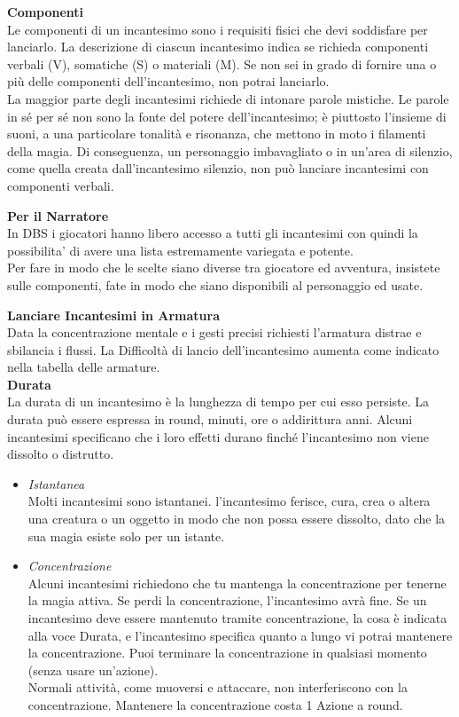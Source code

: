 \textbf{Componenti}\\
Le componenti di un incantesimo sono i requisiti fisici  che devi soddisfare per lanciarlo. La descrizione di  ciascun incantesimo indica se richieda componenti  verbali (V), somatiche (S) o materiali (M). Se non sei in  grado di fornire una o più delle componenti  dell'incantesimo, non potrai lanciarlo.\\
La maggior parte degli incantesimi richiede di intonare parole mistiche. Le parole in sé per sé non sono la  fonte del potere dell'incantesimo; è piuttosto l’insieme di suoni, a una particolare tonalità e risonanza, che mettono in moto i filamenti della magia. Di conseguenza, un personaggio imbavagliato o in un'area di silenzio, come quella creata dall'incantesimo silenzio, non può lanciare incantesimi con componenti verbali.\\
\begin{note}\textbf{Per il Narratore}\\
In DBS i giocatori hanno libero accesso a tutti gli incantesimi con quindi la possibilita' di avere una lista estremamente variegata e potente.\\
Per fare in modo che le scelte siano diverse tra giocatore ed avventura, insistete sulle componenti, fate in modo che siano disponibili al personaggio ed usate.
\end{note}

\textbf{Lanciare Incantesimi in Armatura}\\
Data la concentrazione mentale e i gesti precisi richiesti l'armatura distrae e sbilancia i flussi. La Difficoltà di lancio dell'incantesimo aumenta come indicato nella tabella delle armature.\\

\textbf{Durata}\\
La durata di un incantesimo è la lunghezza di tempo per cui esso persiste. La durata può essere espressa in round, minuti, ore o addirittura anni. Alcuni incantesimi specificano che i loro effetti durano finché l'incantesimo non viene dissolto o distrutto.\\
\begin{itemize}
\item
\textit{Istantanea}\\
Molti incantesimi sono istantanei. l'incantesimo ferisce, cura, crea o altera una creatura o un oggetto in modo che non possa essere dissolto, dato che la sua magia esiste solo per un istante.\\
\item
\textit{Concentrazione}\\
Alcuni incantesimi richiedono che tu mantenga la concentrazione per tenerne la magia attiva. Se perdi la concentrazione, l'incantesimo avrà fine. Se un incantesimo deve essere mantenuto tramite concentrazione, la cosa è indicata alla voce Durata, e l'incantesimo specifica quanto a lungo vi potrai mantenere la concentrazione. Puoi terminare la concentrazione in qualsiasi momento (senza usare un'azione).\\
Normali attività, come muoversi e attaccare, non interferiscono con la concentrazione.
Mantenere la concentrazione costa 1 Azione a round.
\end{itemize}

